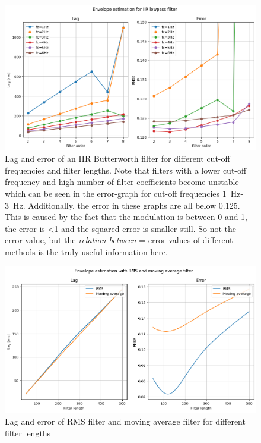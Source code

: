 \begin{figure}[h!t]
	\begin{center}
		\includegraphics[width=1.0\columnwidth]{images/lagerror_iirfilter.png}
	\end{center}
	\caption{Lag and error of an IIR Butterworth filter for different cut-off frequencies and filter lengths. Note that filters with a lower cut-off frequency and high number of filter coefficients become unstable which can be seen in the error-graph for cut-off frequencies \SI{1}{\hertz}-\SI{3}{\hertz}. Additionally, the error in these graphs are all below 0.125. This is caused by the fact that the modulation is between 0 and 1, the error is <1 and the squared error is smaller still. So not the error value, but the \textit{relation between} = error values of different methods is the truly useful information here.}
	\label{fig:lagerror_iir}
\end{figure}

\begin{figure}[h!t]
	\begin{center}
		\includegraphics[width=1.0\columnwidth]{images/lagerror_rms_and_MA_filter.png}
	\end{center}
	\caption{Lag and error of RMS filter and moving average filter for different filter lengths}
	\label{fig:lagerror_RMS_MA}
\end{figure}

